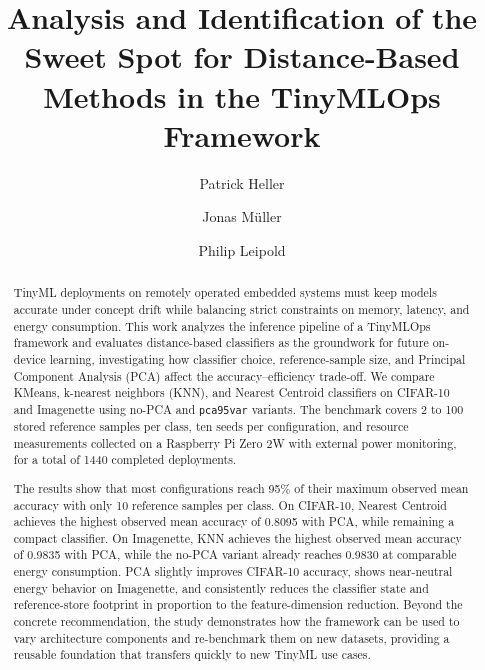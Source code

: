 \documentclass[sigconf,review,nonacm]{acmart}
\begin{document}
\title{Analysis and Identification of the Sweet Spot for Distance-Based Methods in the TinyMLOps Framework}

\author{Patrick Heller}
\author{Jonas M{\"u}ller}
\author{Philip Leipold}

\renewcommand{\shortauthors}{Heller et al.}

\begin{abstract}
TinyML deployments on remotely operated embedded systems must keep models accurate under concept drift while balancing strict constraints on memory, latency, and energy consumption.
This work analyzes the inference pipeline of a TinyMLOps framework and evaluates distance-based classifiers as the groundwork for future on-device learning, investigating how classifier choice, reference-sample size, and Principal Component Analysis (PCA) affect the accuracy--efficiency trade-off.
We compare KMeans, k-nearest neighbors (KNN), and Nearest Centroid classifiers on CIFAR-10 and Imagenette using no-PCA and \texttt{pca95var} variants.
The benchmark covers 2 to 100 stored reference samples per class, ten seeds per configuration, and resource measurements collected on a Raspberry Pi Zero 2W with external power monitoring, for a total of 1440 completed deployments.

The results show that most configurations reach 95\% of their maximum observed mean accuracy with only 10 reference samples per class.
On CIFAR-10, Nearest Centroid achieves the highest observed mean accuracy of 0.8095 with PCA, while remaining a compact classifier.
On Imagenette, KNN achieves the highest observed mean accuracy of 0.9835 with PCA, while the no-PCA variant already reaches 0.9830 at comparable energy consumption.
PCA slightly improves CIFAR-10 accuracy, shows near-neutral energy behavior on Imagenette, and consistently reduces the classifier state and reference-store footprint in proportion to the feature-dimension reduction.
Beyond the concrete recommendation, the study demonstrates how the framework can be used to vary architecture components and re-benchmark them on new datasets, providing a reusable foundation that transfers quickly to new TinyML use cases.
\end{abstract}

\end{document}
